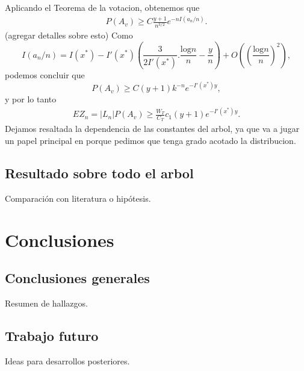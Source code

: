 \documentclass[12pt]{report}
\begin{document}
Aplicando el Teorema de la votacion, obtenemos que 
\begin{align}
    P(A_v) \geq C \frac{y+1}{n^{3/2}} e^{-nI(a_n/n)}.
\end{align}
(agregar detalles sobre esto)
Como 
\[
I(a_n/n) = I(x^*) - I'(x^*)\left(\frac{3}{2I'(x^*)}.\frac{\text{log}n}{n}-\frac{y}{n}\right)+O\left(\left(\frac{\text{log}n}{n}\right)^2\right),
\]
podemos concluir que
\[
P(A_v) \geq C(y+1)k^{-n}e^{-I'(x^*)y},
\]
y por lo tanto
\begin{align}
    EZ_n = |L_n| P(A_v) \geq \frac{W_T}{C_T}c_1 (y+1) e^{-I'(x^*)y}.
\end{align}
Dejamos resaltada la dependencia de las constantes del arbol, ya que va a jugar un papel principal en porque pedimos que tenga grado acotado la distribucion.


















\section{Resultado sobre todo el arbol}
Comparación con literatura o hipótesis.

\chapter{Conclusiones}
\section{Conclusiones generales}
Resumen de hallazgos.

\section{Trabajo futuro}
Ideas para desarrollos posteriores.
\end{document}
